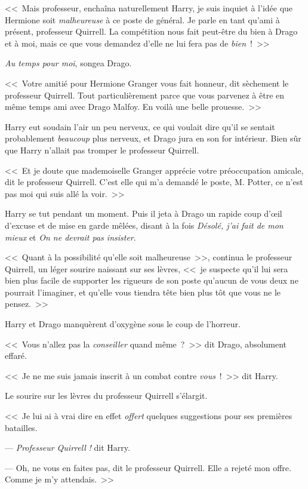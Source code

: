 <<~Mais professeur, enchaîna naturellement Harry, je suis inquiet à l'idée que Hermione soit \emph{malheureuse} à ce poste de général. Je parle en tant qu'ami à présent, professeur Quirrell. La compétition nous fait peut-être du bien à Drago et à moi, mais ce que vous demandez d'elle ne lui fera pas de \emph{bien}~!~>>

\emph{Au temps pour moi}, songea Drago.

<<~Votre amitié pour Hermione Granger vous fait honneur, dit sèchement le professeur Quirrell. Tout particulièrement parce que vous parvenez à être en même temps ami avec Drago Malfoy. En voilà une belle prouesse.~>>

Harry eut soudain l'air un peu nerveux, ce qui voulait dire qu'il se sentait probablement \emph{beaucoup} plus nerveux, et Drago jura en son for intérieur. Bien sûr que Harry n'allait pas tromper le professeur Quirrell.

<<~Et je doute que mademoiselle Granger apprécie votre préoccupation amicale, dit le professeur Quirrell. C'est elle qui m'a demandé le poste, M. Potter, ce n'est pas moi qui suis allé la voir.~>>

Harry se tut pendant un moment. Puis il jeta à Drago un rapide coup d'œil d'excuse et de mise en garde mêlées, disant à la fois \emph{Désolé, j'ai fait de mon mieux} et \emph{On ne devrait pas insister}.

<<~Quant à la possibilité qu'elle soit malheureuse~>>, continua le professeur Quirrell, un léger sourire naissant sur ses lèvres, <<~je suspecte qu'il lui sera bien plus facile de supporter les rigueurs de son poste qu'aucun de vous deux ne pourrait l'imaginer, et qu'elle vous tiendra tête bien plus tôt que vous ne le pensez.~>>

Harry et Drago manquèrent d'oxygène sous le coup de l'horreur.

<<~Vous n'allez pas la \emph{conseiller} quand même~?~>> dit Drago, absolument effaré.

<<~Je ne me suis jamais inscrit à un combat contre \emph{vous}~!~>> dit Harry.

Le sourire sur les lèvres du professeur Quirrell s'élargit.

<<~Je lui ai à vrai dire en effet \emph{offert} quelques suggestions pour ses premières batailles.

--- \emph{Professeur Quirrell} \emph{!} dit Harry.

--- Oh, ne vous en faites pas, dit le professeur Quirrell. Elle a rejeté mon offre. Comme je m'y attendais.~>>


